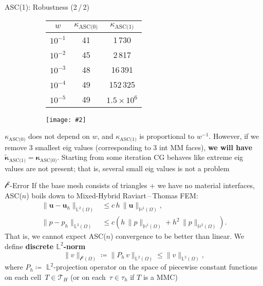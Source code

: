 \documentclass[svgnames]{beamer} %
\newcommand{\includegraphicsw}[2][1.]{\texttt{[image: \#2]}}
\newcommand{\vect}[1]{\boldsymbol{\mathbf{#1}}}
\newcommand{\bmesh}{{\vect{\mathcal T}_H}}
\newcommand{\mmesh}{{\vect{\mathcal \tau}_h}}
\newcommand{\LTwo}{{\mathbb L^2}}
\newcommand{\lTwo}{{\mathcal l^2}}
\newcommand{\LTwoSpace}[1][\Omega]{{\mathbb L^2\left({#1}\right)}}
\newcommand{\HSpace}[1]{{\mathbb H^{#1}\left(\Omega\right)}}
\newcommand{\lTwoSpace}[1][\Omega]{{\mathcal l^2\left({#1}\right)}}
\begin{document}
	\begin{frame}{ASC(1): Robustness (2\,/\,2)}
		\begin{figure}
		\centering
		\caption{Condition Numbers of ASC(0)\,/\,ASC(1) Matrices} 
		\begin{subfigure}{.45\linewidth}
			\centering\footnotesize
			\begin{tabular}[1.2]{ | c | c | c | }
				\hline
				$w$ & $\kappa_{\text{ASC(0)}}$ & $\kappa_{\text{ASC(1)}}$ \\
				\hline
				$10^{-1}$ & 41 & 1\,730 \\ 
				\hline
				$10^{-2}$ & 45 & 2\,817 \\
				\hline
				$10^{-3}$ & 48 & 16\,391 \\
				\hline
				$10^{-4}$ & 49 & 152\,325 \\
				\hline
				$10^{-5}$ & 49 & $1.5\times10^6$ \\
				\hline
			\end{tabular}
		\end{subfigure}%
		\hfill
		\begin{subfigure}{.55\linewidth}
			\centering
			\includegraphicsw{logplot.png}
		\end{subfigure}
		\end{figure}
		$\kappa_{\text{ASC(0)}}$ does not depend on $w$, and $\kappa_{\text{ASC(1)}}$ is proportional to $w^{-1}$. However, if we remove 3 smallest eig values (corresponding to 3 int MM faces), \textbf{we will have $\tilde{\vect\kappa}_{\text{ASC(1)}} = \vect\kappa_{\text{ASC(0)}}$}.
		Starting from some iteration CG behaves like extreme eig values are not present; that is, several small eig values is not a problem 
	\end{frame}

	\begin{frame}{$\lTwo$-Error}
		If the base mesh consists of triangles + we have no material interfaces, ASC($n$) boils down to Mixed-Hybrid Raviart\,--\,Thomas FEM:
		\begin{align*}
			\|\vect u - \vect u_h\|_{\LTwoSpace} &\le c\,h\,\|\vect u\|_{\HSpace{1}},\\
			\|p - p_h\|_{\LTwoSpace} &\le c \left( h\,\|p\|_{\HSpace{1}} + h^2\,\|p\|_{\HSpace{2}} \right).
		\end{align*}
		That is, we cannot expect ASC($n$) convergence to be better than linear. We define \textbf{discrete $\LTwo$-norm}
		\begin{equation*}
			\| v \|_{\lTwoSpace} \coloneqq \| P_h\,v \|_{\LTwoSpace} \le \| v \|_{\LTwoSpace},
		\end{equation*} 
		where $P_h \coloneqq$ $\LTwo$-projection operator on the space of piecewise constant functions on each cell~$T \in \bmesh$ (or on each~$\tau \in \mmesh$ if $T$ is a MMC)
	\end{frame}
\end{document}
